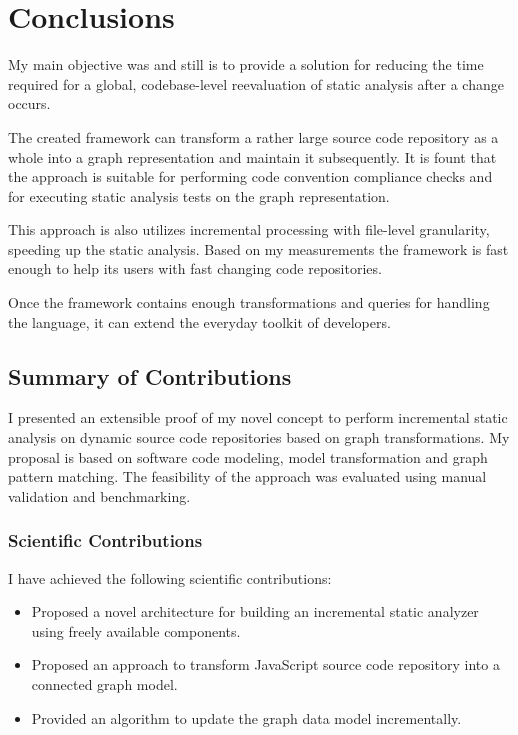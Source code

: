 \chapter{Conclusions}
\label{chap:conclusions}

My main objective was and still is to provide a solution for reducing the time required for a global, codebase-level reevaluation of static analysis after a change occurs.

The created framework can transform a rather large source code repository as a whole into a graph representation and maintain it subsequently. It is fount that the approach is suitable for performing code convention compliance checks and for executing static analysis tests on the graph representation.

This approach is also utilizes incremental processing with file-level granularity, speeding up the static analysis. Based on my measurements the framework is fast enough to help its users with fast changing code repositories.

Once the framework contains enough transformations and queries for handling the language, it can extend the everyday toolkit of developers.

\section{Summary of Contributions}
I presented an extensible proof of my novel concept to perform incremental static analysis on dynamic source code repositories based on graph transformations. My proposal is based on software code modeling, model transformation and graph pattern matching. The feasibility of the approach was evaluated using manual validation and benchmarking.

\subsection{Scientific Contributions}
I have achieved the following scientific contributions:

\begin{itemize}[topsep=0pt]
	\item Proposed a novel architecture for building an incremental static analyzer using freely available components.
	\item Proposed an approach to transform JavaScript source code repository into a connected graph model.
	\item Provided an algorithm to update the graph data model incrementally.
\end{itemize}

